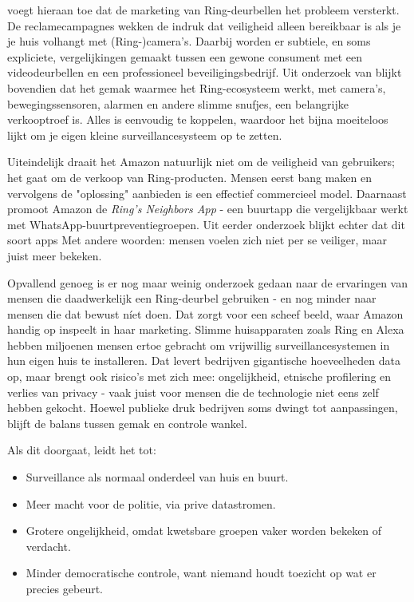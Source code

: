 \documentclass[nonacm, sigconf]{acmart}
\begin{document}
    \noindent \parencite{kelly2023ring} voegt hieraan toe dat de marketing van Ring-deurbellen het probleem versterkt.
    De reclamecampagnes wekken de indruk dat veiligheid alleen bereikbaar is als je je huis volhangt met (Ring-)camera's.
    Daarbij worden er subtiele, en soms expliciete, vergelijkingen gemaakt tussen een gewone consument met een videodeurbellen en een professioneel beveiligingsbedrijf.
    Uit onderzoek van \citeauthor{kelly2023ring} blijkt bovendien dat het gemak waarmee het Ring-ecosysteem werkt, met camera's, bewegingssensoren, alarmen en andere slimme snufjes, een belangrijke verkooptroef is.
    Alles is eenvoudig te koppelen, waardoor het bijna moeiteloos lijkt om je eigen kleine surveillancesysteem op te zetten.

    \noindent Uiteindelijk draait het Amazon natuurlijk niet om de veiligheid van gebruikers; het gaat om de verkoop van Ring-producten.
    Mensen eerst bang maken en vervolgens de "oplossing" aanbieden is een effectief commercieel model.
    Daarnaast promoot Amazon de \textit{Ring's Neighbors App} - een buurtapp die vergelijkbaar werkt met WhatsApp-buurtpreventiegroepen.
    Uit eerder onderzoek blijkt echter dat dit soort apps
    Met andere woorden: mensen voelen zich niet per se veiliger, maar juist meer bekeken.

    \noindent Opvallend genoeg is er nog maar weinig onderzoek gedaan naar de ervaringen van mensen die daadwerkelijk een Ring-deurbel gebruiken - en nog minder naar mensen die dat bewust níet doen.
    Dat zorgt voor een scheef beeld, waar Amazon handig op inspeelt in haar marketing.
    Slimme huisapparaten zoals Ring en Alexa hebben miljoenen mensen ertoe gebracht om vrijwillig surveillancesystemen in hun eigen huis te installeren.
    Dat levert bedrijven gigantische hoeveelheden data op, maar brengt ook risico's met zich mee: ongelijkheid, etnische profilering en verlies van privacy - vaak juist voor mensen die de technologie niet eens zelf hebben gekocht.
    Hoewel publieke druk bedrijven soms dwingt tot aanpassingen, blijft de balans tussen gemak en controle wankel.

    \noindent Als dit doorgaat, leidt het tot:
    \begin{itemize}
        \item Surveillance als normaal onderdeel van huis en buurt.
        \item Meer macht voor de politie, via prive datastromen.
        \item Grotere ongelijkheid, omdat kwetsbare groepen vaker worden bekeken of verdacht.
        \item Minder democratische controle, want niemand houdt toezicht op wat er precies gebeurt.
    \end{itemize}
\end{document}

